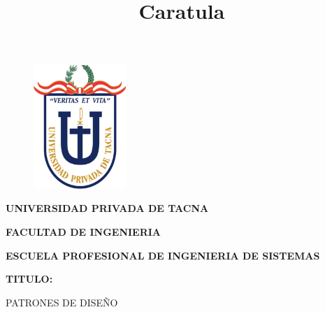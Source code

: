 \documentclass[12pt,letterpaper]{article}
\begin{document}
%


\title{Caratula}

\begin{titlepage}
\begin{center}
\begin{figure}[htb]
\begin{center}
\includegraphics[width=3.5cm]{./img/logo}
\end{center}
\end{figure}

\vspace*{0.15in}
\begin{Large}
\textbf{UNIVERSIDAD PRIVADA DE TACNA}\\
\end{Large}

\vspace*{0.1in}
\begin{Large}
\textbf{FACULTAD DE INGENIERIA} \\
\end{Large}

\vspace*{0.1in}
\begin{Large}
\textbf{ESCUELA PROFESIONAL DE INGENIERIA DE SISTEMAS} \\
\end{Large}

\vspace*{0.5in}
\begin{Large}
\textbf{TITULO:}\\
\end{Large}

\vspace*{0.1in}
\begin{Large}
PATRONES DE DISEÑO \\
\end{Large}


\end{center}
\end{titlepage}
\end{document}
